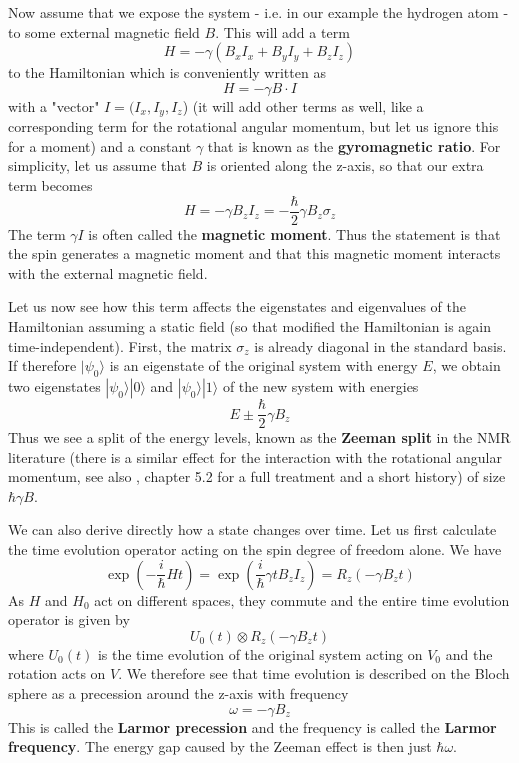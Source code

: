 \documentclass[a4paper, draft]{article}
\theoremstyle{own}
\theoremstyle{remark}
\begin{document}
Now assume that we expose the system - i.e. in our example the hydrogen atom - to some external magnetic field $B$. This will add a term
$$
H = - \gamma (B_x I_x + B_y I_y + B_z I_z )
$$
to the Hamiltonian which is conveniently written as
$$
H = -  \gamma B \cdot I
$$
with a "vector" $I = (I_x, I_y, I_z$) (it will add other terms as well, like a corresponding term for the rotational angular momentum, but let us ignore this for a moment) and a constant $\gamma$ that is known as the {\bf gyromagnetic ratio}. For simplicity, let us assume that $B$ is oriented along the z-axis, so that our extra term becomes
$$
H = - \gamma B_z I_z = - \frac{\hbar}{2} \gamma B_z \sigma_z
$$
The term $\gamma I$ is often called the {\bf magnetic moment}. Thus the statement is that the spin generates a magnetic moment and that this magnetic moment interacts with the external magnetic field.

Let us now see how this term affects the eigenstates and eigenvalues of the Hamiltonian assuming a static field (so that modified the Hamiltonian is again time-independent). First, the matrix $\sigma_z$ is already diagonal in the standard basis. If therefore $|\psi_0 \rangle$ is an eigenstate of the original system with energy $E$, we obtain two eigenstates $|\psi_0 \rangle |0 \rangle$ and $|\psi_0 \rangle |1 \rangle$ of the new system with energies
$$
E \pm  \frac{\hbar}{2} \gamma B_z
$$
Thus we see a split of the energy levels, known as the {\bf Zeeman split} in the NMR literature (there is a similar effect for the interaction with the rotational angular momentum,  see also \cite{WeinbergQM}, chapter 5.2 for a full treatment and a short history) of size $\hbar \gamma B$. 

We can also derive directly how a state changes over time. Let us first calculate the time evolution operator acting on the spin degree of freedom alone. We have
$$
\exp\left( {-\frac{i}{\hbar}Ht} \right)  = \exp\left( {\frac{i}{\hbar} \gamma t B_z I_z} \right) =   
R_z(-\gamma B_z t)
$$
As $H$ and $H_0$ act on different spaces, they commute and the entire time evolution operator is given by
$$
U_0(t) \otimes R_z(-\gamma B_z t)
$$
where $U_0(t)$ is the time evolution of the original system acting on $V_0$ and the rotation acts on $V$. We therefore see that time evolution is described on the Bloch sphere as a precession around the z-axis with frequency
$$
\omega = -\gamma B_z 
$$
This is called the {\bf Larmor precession} and the frequency is called the {\bf Larmor frequency}. The energy gap caused by the Zeeman effect is then just $\hbar \omega$. 
\end{document}
